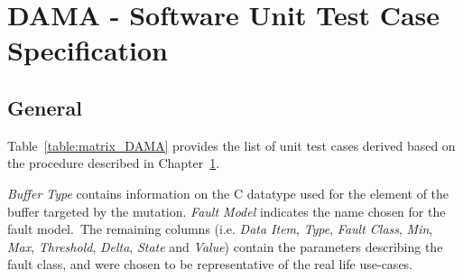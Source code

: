 
\chapter{DAMA - Software Unit Test Case Specification}
\label{chap:spec_DAMA}

\section{General}

Table~\ref{table:matrix_DAMA} provides the list of unit test cases derived based on the procedure described in Chapter~\ref{chap:spec_DAMA}.

\emph{Buffer Type} contains information on the C datatype used for the element of the buffer targeted by the mutation.
\emph{Fault Model} indicates the name chosen for the fault model.\
The remaining columns (i.e. \emph{Data Item}, \emph{Type}, \emph{Fault Class}, \emph{Min}, \emph{Max}, \emph{Threshold}, \emph{Delta}, \emph{State}  and \emph{Value}) contain the parameters describing the fault class, and were chosen to be representative of the real life use-cases.


